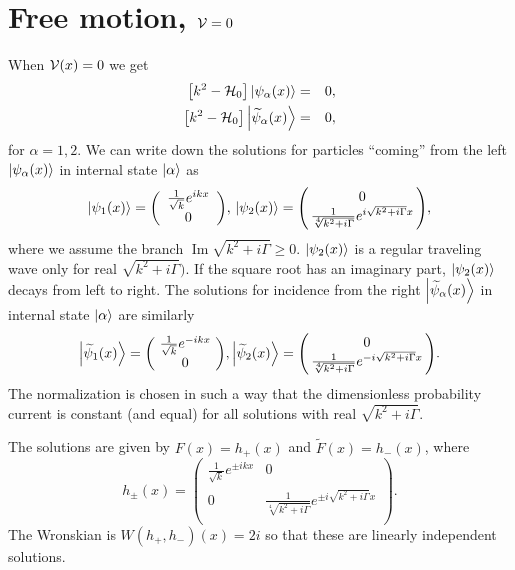 \section{Free motion, ${\cal V}=0$}
%
%
When ${\cal V}(x)=0$ we get
%
\begin{eqnarray}
	\left[k^2-{\cal H}_{0}\right]\ket{\psi_{\alpha}(x)}&=&0,
	\nonumber\\
	\left[k^2-{\cal H}_{0}\right]\ket{\widetilde{\psi}_{\alpha}(x)}&=&0,
\end{eqnarray}
%
for $\alpha=1,2$.
We can write down the solutions for particles ``coming'' from the left $\ket{\psi_{\alpha}(x)}$ in  internal state $\ket{\alpha}$ as
%
\begin{equation}
	\ket{\psi_{1}(x)} = \left(\begin{array}{c}
	\frac{1}{\sqrt{k}} e^{i k x}\\
	0
	\end{array}\right)\!,
	\,
	\ket{\psi_{2}(x)} = \left(\!\!\begin{array}{c}
	0\\
	\frac{1}{\sqrt[4]{k^2+i \Gamma}} e^{i \sqrt{k^2+i \Gamma}x}
	\end{array}\!\!\right)\!,
\end{equation}
%
where we assume the branch $\operatorname{Im} \sqrt{k^2+i \Gamma}\ge 0$.
$\ket{\psi_2(x)}$ is a regular traveling wave only for real $\sqrt{k^2+i\Gamma})$. If the square root has an imaginary part,  $\ket{\psi_2(x)}$  decays  from left to right.
%
The solutions for incidence from the right  $\ket{\widetilde{\psi}_{\alpha}(x)}$ in internal state $\ket{\alpha}$ are similarly
%
\begin{equation}
	\ket{\widetilde{\psi}_{1}(x)} = \left(\!\begin{array}{c}
	\frac{1}{\sqrt{k}} e^{-i k x}\\
	0
	\end{array}\!\right)\!,
	\ket{\widetilde{\psi}_{2}(x)} = \left(\!\!\begin{array}{c}
	0\\
	\frac{1}{\sqrt[4]{k^2+i \Gamma}} e^{-i \sqrt{k^2+i \Gamma}x}
	\end{array}\!\!\right)\!.
\end{equation}
%
The normalization is chosen in such a way that the dimensionless probability current
is constant (and equal) for all solutions with real $\sqrt{k^2+i\Gamma}$.


The solutions are given by $F(x) = h_+ (x)$ and $\widetilde F (x) = h_- (x)$, where
%
\begin{equation}
	h_{\pm}(x)=\left(\begin{array}{cc}
	\frac{1}{\sqrt{k}}e^{\pm i k x} & 0\\
	0 & \frac{1}{\sqrt[4]{k^2+i \Gamma}} e^{\pm i \sqrt{k^2+i \Gamma} x} \\
	\end{array}\right).
\end{equation}
%
The Wronskian is $W(h_{+},h_{-})(x)=2i$ so that these are linearly independent solutions.


